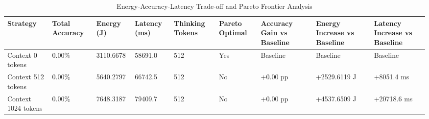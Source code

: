 \begin{table}
\caption{Energy-Accuracy-Latency Trade-off and Pareto Frontier Analysis}
\label{tab:tradeoff_comparison}
\begin{tabular}{lllllllll}
\toprule
Strategy & Total Accuracy & Energy (J) & Latency (ms) & Thinking Tokens & Pareto Optimal & Accuracy Gain vs Baseline & Energy Increase vs Baseline & Latency Increase vs Baseline \\
\midrule
Context 0 tokens & 0.00\% & 3110.6678 & 58691.0 & 512 & Yes & Baseline & Baseline & Baseline \\
Context 512 tokens & 0.00\% & 5640.2797 & 66742.5 & 512 & No & +0.00 pp & +2529.6119 J & +8051.4 ms \\
Context 1024 tokens & 0.00\% & 7648.3187 & 79409.7 & 512 & No & +0.00 pp & +4537.6509 J & +20718.6 ms \\
\bottomrule
\end{tabular}
\end{table}
